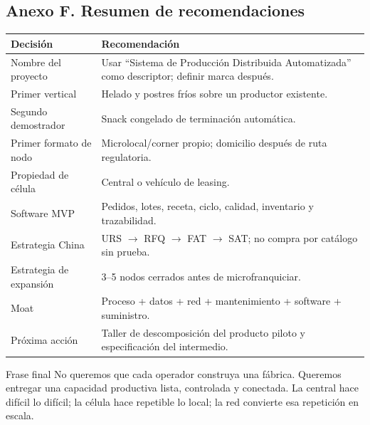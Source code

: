 \documentclass[11pt,a4paper]{article}
\begin{document}
\subsection*{Anexo F. Resumen de recomendaciones}
{\small
\begin{xltabular}{\textwidth}{@{}P{4.2cm}L@{}}
\toprule
\textbf{Decisión} & \textbf{Recomendación}\\ \midrule
Nombre del proyecto & Usar “Sistema de Producción Distribuida Automatizada” como descriptor; definir marca después.\\
Primer vertical & Helado y postres fríos sobre un productor existente.\\
Segundo demostrador & Snack congelado de terminación automática.\\
Primer formato de nodo & Microlocal/corner propio; domicilio después de ruta regulatoria.\\
Propiedad de célula & Central o vehículo de leasing.\\
Software MVP & Pedidos, lotes, receta, ciclo, calidad, inventario y trazabilidad.\\
Estrategia China & URS $\rightarrow$ RFQ $\rightarrow$ FAT $\rightarrow$ SAT; no compra por catálogo sin prueba.\\
Estrategia de expansión & 3--5 nodos cerrados antes de microfranquiciar.\\
Moat & Proceso + datos + red + mantenimiento + software + suministro.\\
Próxima acción & Taller de descomposición del producto piloto y especificación del intermedio.\\
\bottomrule
\end{xltabular}}

\begin{caja}{Frase final}
No queremos que cada operador construya una fábrica. Queremos entregar una capacidad productiva lista,
controlada y conectada. La central hace difícil lo difícil; la célula hace repetible lo local; la red
convierte esa repetición en escala.
\end{caja}
\end{document}
